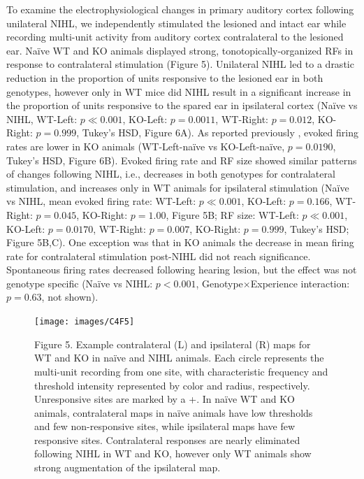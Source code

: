 To examine the electrophysiological changes in primary auditory cortex following unilateral NIHL, we independently stimulated the lesioned and intact ear while recording multi-unit activity from auditory cortex contralateral to the lesioned ear. Na\"ive WT and KO animals displayed strong, tonotopically-organized RFs in response to contralateral stimulation (Figure 5). Unilateral NIHL led to a drastic reduction in the proportion of units responsive to the lesioned ear in both genotypes, however only in WT mice did NIHL result in a significant increase in the proportion of units responsive to the spared ear in ipsilateral cortex (Na\"ive vs NIHL, WT-Left: $p\ll0.001$, KO-Left: $p=0.0011$, WT-Right: $p=0.012$, KO-Right: $p=0.999$, Tukey's HSD, Figure 6A). As reported previously \cite{Yang2013}, evoked firing rates are lower in KO animals (WT-Left-na\"ive vs KO-Left-na\"ive, $p=0.0190$, Tukey's HSD, Figure 6B). Evoked firing rate and RF size showed similar patterns of changes following NIHL, i.e., decreases in both genotypes for contralateral stimulation, and increases only in WT animals for ipsilateral stimulation (Na\"ive vs NIHL, mean evoked firing rate: WT-Left: $p\ll0.001$, KO-Left: $p=0.166$, WT-Right: $p=0.045$, KO-Right: $p=1.00$, Figure 5B; RF size: WT-Left: $p\ll0.001$, KO-Left: $p=0.0170$, WT-Right: $p=0.007$, KO-Right: $p=0.999$, Tukey's HSD; Figure 5B,C). One exception was that in KO animals the decrease in mean firing rate for contralateral stimulation post-NIHL did not reach significance. Spontaneous firing rates decreased following hearing lesion, but the effect was not genotype specific (Na\"ive vs NIHL: $p<0.001$, Genotype$\times$Experience interaction: $p=0.63$, not shown).

\begin{figure}
	\centering
		\texttt{[image: images/C4F5]}
	\begin{changemargin}{1in}{1in}
	\footnotesize{Figure 5. Example contralateral (L) and ipsilateral (R) maps for WT and KO in na\"ive and NIHL animals. Each circle represents the multi-unit recording from one site, with characteristic frequency and threshold intensity represented by color and radius, respectively. Unresponsive sites are marked by a +. In na\"ive WT and KO animals, contralateral maps in na\"ive animals have low thresholds and few non-responsive sites, while ipsilateral maps have few responsive sites. Contralateral responses are nearly eliminated following NIHL in WT and KO, however only WT animals show strong augmentation of the ipsilateral map.}
	\end{changemargin}
\end{figure}


